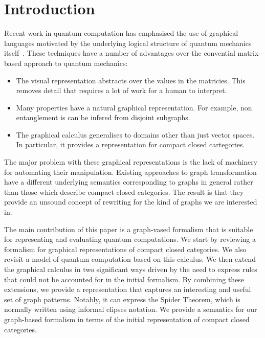 \documentclass[runningheads]{llncs}
\begin{document}
\section{Introduction}
\label{sec:introduction}

Recent work in quantum computation has emphasised the use of graphical
languages motivated by the underlying logical structure of quantum
mechanics
itself~\cite{AbrCoe:CatSemQuant:2004,Selinger:dagger:2005,Coecke2005Kindergarten-Qu,Coecke2006POVMs-and-Naima,Coecke2006Quantum-Measure}.
These techniques have a number of advantages over the convential
matrix-based approach to quantum mechanics:

\begin{itemize}
\item The visual representation abstracts over the values in the
  matricies. This removes detail that requires a lot of work for a
  human to interpret. 

\item Many properties have a natural graphical representation. For
  example, non entanglement is can be infered from disjoint subgraphs.

\item The graphical calculus generalises to domains other than just
  vector spaces. In particular, it provides a representation for
  compact closed cartegories. 

\end{itemize}

The major problem with these graphical representations is the lack of
machinery for automating their manipulation. Existing approaches to
graph transformation have a different underlying semantics
corresponding to graphs in general rather than those which describe
compact closed categories. The result is that they provide an unsound
concept of rewriting for the kind of graphs we are interested in.

The main contribution of this paper is a graph-vased formalism that is
suitable for representing and evaluating quantum computations. We
start by reviewing a formalism for graphical representations of
compact closed categories. We also revisit a model of quantum
computation based on this calculus. We then extend the graphical
calculus in two significant ways driven by the need to express rules
that could not be accounted for in the initial formalism. By combining
these extensions, we provide a representation that captures an
interesting and useful set of graph patterns. Notably, it can express
the Spider Theorem, which is normally written using informal elipses
notation. We provide a semantics for our graph-based formalism in
terms of the initial representation of compact closed categories.
\end{document}

